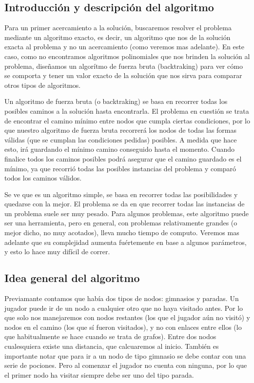 \subsection{Introducción y descripción del algoritmo}

\par Para un primer acercamiento a la solución, buscaremos resolver el problema mediante un algoritmo exacto, es decir, un algoritmo que nos de la solución exacta al problema y no un acercamiento (como veremos mas adelante). En este caso, como no encontramos algoritmos polinomiales que nos brinden la solución al problema, diseñamos un algorítmo de fuerza bruta (backtraking) para ver cómo se comporta y tener un valor exacto de la solución que nos sirva para comparar otros tipos de algoritmos.

\par Un algoritmo de fuerza bruta (o backtraking) se basa en recorrer todas los posibles caminos a la solución hasta encontrarla. El problema en cuestión se trata de encontrar el camino mínimo entre nodos que cumpla ciertas condiciones, por lo que nuestro algoritmo de fuerza bruta recorrerá los nodos de todas las formas válidas (que se cumplan las condiciones pedidas) posibles. A medida que hace esto, irá guardando el mínimo camino conseguido hasta el momento. Cuando finalice todos los caminos posibles podrá asegurar que el camino guardado es el mínimo, ya que recorrió todas las posibles instancias del problema y comparó todos los caminos válidos.

\par Se ve que es un algoritmo simple, se basa en recorrer todas las posibilidades y quedarse con la mejor. El problema se da en que recorrer todas las instancias de un problema suele ser muy pesado. Para algunos problemas, este algoritmo puede ser una herramienta, pero en general, con problemas relativamente grandes (o mejor dicho, no muy acotados), lleva mucho tiempo de computo. Veremos mas adelante que su complejidad aumenta fuértemente en base a algunos parámetros, y esto lo hace muy difícil de correr.

\subsection{Idea general del algoritmo}

\par Previamante contamos que había dos tipos de nodos: gimnasios y paradas. Un jugador puede ir de un nodo a cualquier otro que no haya visitado antes. Por lo que solo nos manejaremos con nodos restantes (los que el jugador aún no visitó) y nodos en el camino (los que sí fueron visitados), y no con enlaces entre ellos (lo que habitualmente se hace cuando se trata de grafos). Entre dos nodos cualesquiera existe una distancia, que calcuaremos al inicio. También es importante notar que para ir a un nodo de tipo gimnasio se debe contar con una serie de pociones. Pero al comenzar el jugador no cuenta con ninguna, por lo que el primer nodo ha visitar siempre debe ser uno del tipo parada.

